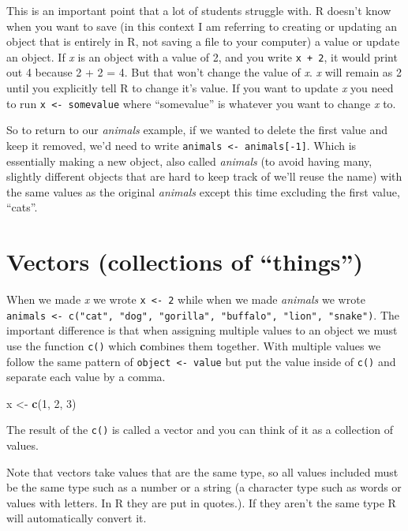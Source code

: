 \documentclass[
  12pt,
]{book}
\newenvironment{Shaded}{\begin{snugshade}}{\end{snugshade}}
\newcommand{\DecValTok}[1]{\textcolor[rgb]{0.00,0.00,0.81}{#1}}
\newcommand{\KeywordTok}[1]{\textcolor[rgb]{0.13,0.29,0.53}{\textbf{#1}}}
\newcommand{\NormalTok}[1]{#1}
\newcommand{\StringTok}[1]{\textcolor[rgb]{0.31,0.60,0.02}{#1}}
\begin{document}
This is an important point that a lot of students struggle with. R doesn't know when you want to save (in this context I am referring to creating or updating an object that is entirely in R, not saving a file to your computer) a value or update an object. If \emph{x} is an object with a value of 2, and you write \texttt{x\ +\ 2}, it would print out 4 because 2 + 2 = 4. But that won't change the value of \emph{x}. \emph{x} will remain as 2 until you explicitly tell R to change it's value. If you want to update \emph{x} you need to run \texttt{x\ \textless{}-\ somevalue} where ``somevalue'' is whatever you want to change \emph{x} to.

So to return to our \emph{animals} example, if we wanted to delete the first value and keep it removed, we'd need to write \texttt{animals\ \textless{}-\ animals{[}-1{]}}. Which is essentially making a new object, also called \emph{animals} (to avoid having many, slightly different objects that are hard to keep track of we'll reuse the name) with the same values as the original \emph{animals} except this time excluding the first value, ``cats''.

\hypertarget{vectors}{%
\section{Vectors (collections of ``things'')}\label{vectors}}

When we made \emph{x} we wrote \texttt{x\ \textless{}-\ 2} while when we made \emph{animals} we wrote \texttt{animals\ \textless{}-\ c("cat",\ "dog",\ "gorilla",\ "buffalo",\ "lion",\ "snake")}. The important difference is that when assigning multiple values to an object we must use the function \texttt{c()} which \textbf{c}ombines them together. With multiple values we follow the same pattern of \texttt{object\ \textless{}-\ value} but put the value inside of \texttt{c()} and separate each value by a comma.

\begin{Shaded}
\begin{Highlighting}[]
\NormalTok{x <{-}}\StringTok{ }\KeywordTok{c}\NormalTok{(}\DecValTok{1}\NormalTok{, }\DecValTok{2}\NormalTok{, }\DecValTok{3}\NormalTok{)}
\end{Highlighting}
\end{Shaded}

The result of the \texttt{c()} is called a vector and you can think of it as a collection of values.

Note that vectors take values that are the same type, so all values included must be the same type such as a number or a string (a character type such as words or values with letters. In R they are put in quotes.). If they aren't the same type R will automatically convert it.
\end{document}
